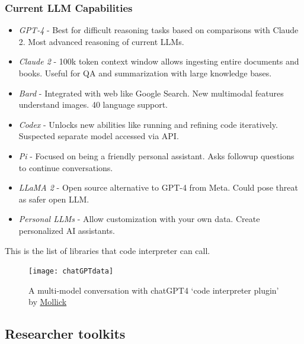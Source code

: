 \subsubsection{Current LLM Capabilities}

\begin{itemize}
\item \textit{GPT-4} - Best for difficult reasoning tasks based on comparisons with Claude 2. Most advanced reasoning of current LLMs.

\item \textit{Claude 2} - 100k token context window allows ingesting entire documents and books. Useful for QA and summarization with large knowledge bases.

\item \textit{Bard} - Integrated with web like Google Search. New multimodal features understand images. 40 language support.

\item \textit{Codex} - Unlocks new abilities like running and refining code iteratively. Suspected separate model accessed via API.

\item \textit{Pi} - Focused on being a friendly personal assistant. Asks followup questions to continue conversations.

\item \textit{LLaMA 2} - Open source alternative to GPT-4 from Meta. Could pose threat as safer open LLM.

\item \textit{Personal LLMs} - Allow customization with your own data. Create personalized AI assistants.
\end{itemize}

This is the list of libraries that code interpreter can call.




\begin{figure}
  \centering
    \texttt{[image: chatGPTdata]}
  \caption{A multi-model conversation with chatGPT4 `code interpreter plugin' by \href{https://www.oneusefulthing.org/p/it-is-starting-to-get-strange}{Mollick}}
  \label{fig:chatGPTdata}
\end{figure}


\subsection{Researcher toolkits}
